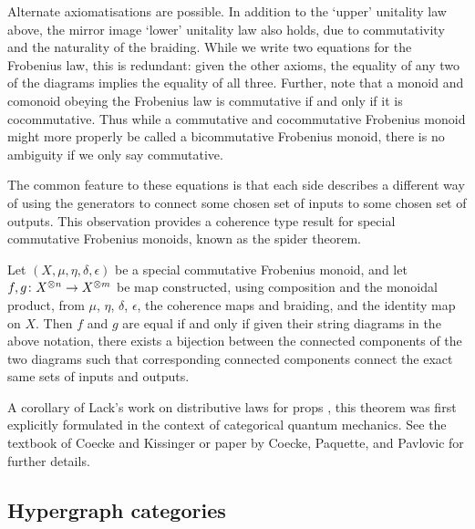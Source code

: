 Alternate axiomatisations are possible. In addition to the `upper' unitality law
above, the mirror image `lower' unitality law also holds, due to commutativity
and the naturality of the braiding. While we write two equations for the
Frobenius law, this is redundant: given the other axioms, the equality of any
two of the diagrams implies the equality of all three.  Further, note that a
monoid and comonoid obeying the Frobenius law is commutative if and only if it
is cocommutative. Thus while a commutative and cocommutative Frobenius monoid
might more properly be called a bicommutative Frobenius monoid, there is no
ambiguity if we only say commutative.

The common feature to these equations is that each side describes a different
way of using the generators to connect some chosen set of inputs to some chosen
set of outputs. This observation provides a coherence type result for special
commutative Frobenius monoids, known as the spider theorem.
\begin{theorem}
  Let $(X,\mu,\eta,\delta,\epsilon)$ be a special commutative Frobenius monoid,
  and let $f,g{\colon} X^{\otimes n} \to X^{\otimes m}$ be map constructed, using
  composition and the monoidal product, from $\mu$, $\eta$, $\delta$, $\epsilon$, the
  coherence maps and braiding, and the identity map on $X$. Then $f$ and $g$ are
  equal if and only if given their string diagrams in the above notation, there
  exists a bijection between the connected components of the two diagrams such
  that corresponding connected components connect the exact same sets of inputs
  and outputs.
\end{theorem}%
A corollary of Lack's work on distributive laws for props \cite{Lac04}, this
theorem was first explicitly formulated in the context of categorical quantum
mechanics.  See the textbook of Coecke and Kissinger \cite{CK} or paper by
Coecke, Paquette, and Pavlovic \cite{CPP} for further details.

\subsection{Hypergraph categories}

